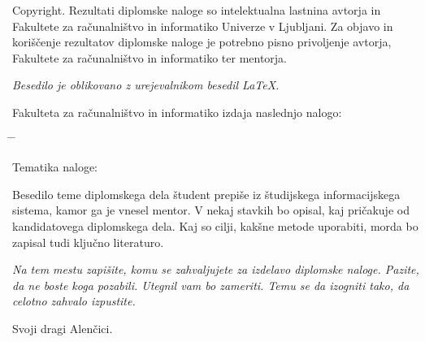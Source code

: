 \documentclass[a4paper, 12pt]{book}
\newcommand{\clearemptydoublepage}{\newpage{\pagestyle{empty}\cleardoublepage}}
\begin{document}
\noindent
{\sc Copyright}. 
Rezultati diplomske naloge so intelektualna lastnina avtorja in Fakultete za računalništvo in informatiko Univerze v Ljubljani.
Za objavo in koriščenje rezultatov diplomske naloge je potrebno pisno privoljenje avtorja, Fakultete za računalništvo in informatiko ter mentorja.

\begin{center}
\mbox{}\vfill
\emph{Besedilo je oblikovano z urejevalnikom besedil \LaTeX.}
\end{center}
\clearemptydoublepage

\thispagestyle{empty}
\vspace*{4cm}

\noindent
Fakulteta za računalništvo in informatiko izdaja naslednjo nalogo:
\medskip
\begin{tabbing}
\hspace{32mm}\= \hspace{6cm} \= \kill


Tematika naloge:
\end{tabbing}
Besedilo teme diplomskega dela študent prepiše iz študijskega informacijskega sistema, kamor ga je vnesel mentor. V nekaj stavkih bo opisal, kaj pričakuje od kandidatovega diplomskega dela. Kaj so cilji, kakšne metode uporabiti, morda bo zapisal tudi ključno literaturo.
\vspace{15mm}




\vspace{2cm}

\clearemptydoublepage

\thispagestyle{empty}\mbox{}\vfill\null\it%
\noindent
Na tem mestu zapišite, komu se zahvaljujete za izdelavo diplomske naloge. Pazite, da ne boste koga pozabili. Utegnil vam bo zameriti. Temu se da izogniti tako, da celotno zahvalo izpustite.
\rm\normalfont

\clearemptydoublepage

\thispagestyle{empty}\mbox{}{\textheight}\mbox{}\hfill\begin{minipage}{0.55\textwidth}%
Svoji dragi Alenčici.
\normalfont\end{minipage}

\clearemptydoublepage


\pagestyle{empty}
\def\thepage{}%
\tableofcontents{}
\end{document}

